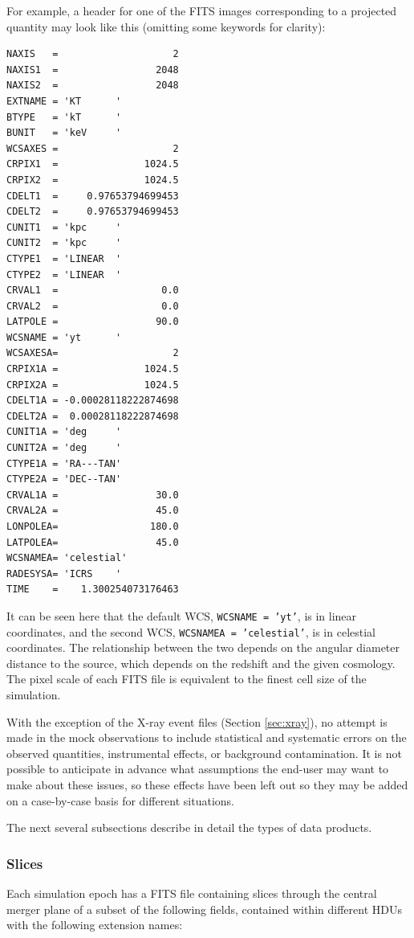 \documentclass{emulateapj}
\newcommand{\code}[1]{\texttt{#1}}
\begin{document}
For example, a header for one of the FITS images corresponding to a projected quantity may look like this (omitting some keywords for clarity):

\begin{verbatim}
NAXIS   =                    2
NAXIS1  =                 2048
NAXIS2  =                 2048
EXTNAME = 'KT      '
BTYPE   = 'kT      '
BUNIT   = 'keV     '
WCSAXES =                    2
CRPIX1  =               1024.5
CRPIX2  =               1024.5
CDELT1  =     0.97653794699453
CDELT2  =     0.97653794699453
CUNIT1  = 'kpc     '
CUNIT2  = 'kpc     '
CTYPE1  = 'LINEAR  '
CTYPE2  = 'LINEAR  '
CRVAL1  =                  0.0
CRVAL2  =                  0.0
LATPOLE =                 90.0
WCSNAME = 'yt      '
WCSAXESA=                    2
CRPIX1A =               1024.5
CRPIX2A =               1024.5
CDELT1A = -0.00028118222874698
CDELT2A =  0.00028118222874698
CUNIT1A = 'deg     '
CUNIT2A = 'deg     '
CTYPE1A = 'RA---TAN'
CTYPE2A = 'DEC--TAN'
CRVAL1A =                 30.0
CRVAL2A =                 45.0
LONPOLEA=                180.0
LATPOLEA=                 45.0
WCSNAMEA= 'celestial'
RADESYSA= 'ICRS    '
TIME    =    1.300254073176463
\end{verbatim}

It can be seen here that the default WCS, \code{WCSNAME = 'yt'}, is in linear coordinates, and the second WCS, \code{WCSNAMEA = 'celestial'}, is in celestial coordinates. The relationship between the two depends on the angular diameter distance to the source, which depends on the redshift and the given cosmology. The pixel scale of each FITS file is equivalent to the finest cell size of the simulation.

With the exception of the X-ray event files (Section \ref{sec:xray}), no attempt is made in the mock observations to include statistical and systematic errors on the observed quantities, instrumental effects, or background contamination. It is not possible to anticipate in advance what assumptions the end-user may want to make about these issues, so these effects have been left out so they may be added on a case-by-case basis for different situations.

The next several subsections describe in detail the types of data products.

\subsubsection{Slices}\label{sec:slices}

Each simulation epoch has a FITS file containing slices through the central merger plane of a subset of the following fields, contained within different HDUs with the following extension names:
\end{document}
